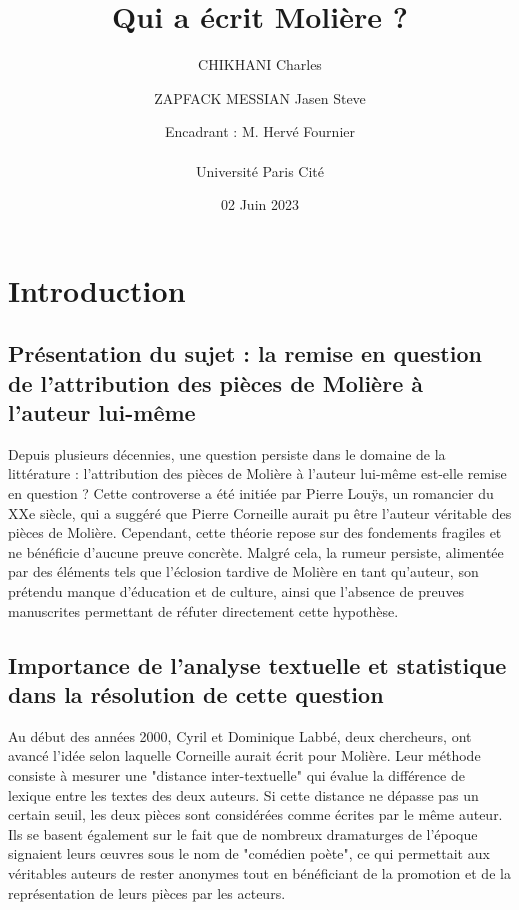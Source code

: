 \documentclass[]{report}
\title{Qui a écrit Molière ?}
\author{CHIKHANI Charles \and ZAPFACK MESSIAN Jasen Steve \\ \and Encadrant : M. Hervé Fournier\\ \\ Université Paris Cité}
\date{02 Juin 2023}
\begin{document}
	\maketitle
	
	\begin{abstract}
	\end{abstract}


	\maketitle
	\tableofcontents
	
	\newpage
	\renewcommand{\thesection}{\arabic{section}}
	\section{Introduction}
	\subsection{Présentation du sujet : la remise en question de l'attribution des pièces de Molière à l'auteur lui-même}
\vspace{\baselineskip}
\hspace{0,5cm}Depuis plusieurs décennies, une question persiste dans le domaine de la
littérature : l'attribution des pièces de Molière à l'auteur lui-même est-elle
remise en question ? Cette controverse a été initiée par Pierre Louÿs, un
romancier du XXe siècle, qui a suggéré que Pierre Corneille aurait pu être
l'auteur véritable des pièces de Molière. Cependant, cette théorie repose sur
des fondements fragiles et ne bénéficie d'aucune preuve concrète. Malgré cela,
la rumeur persiste, alimentée par des éléments tels que l'éclosion tardive de
Molière en tant qu'auteur, son prétendu manque d'éducation et de culture, ainsi
que l'absence de preuves manuscrites permettant de réfuter directement cette
hypothèse.

\subsection{Importance de l'analyse textuelle et statistique dans la résolution de cette question}
\vspace{\baselineskip}
\hspace{0,5cm}Au début des années 2000, Cyril et Dominique Labbé, deux chercheurs, ont avancé
l'idée selon laquelle Corneille aurait écrit pour Molière. Leur méthode consiste
à mesurer une "distance inter-textuelle" qui évalue la différence de lexique
entre les textes des deux auteurs. Si cette distance ne dépasse pas un certain
seuil, les deux pièces sont considérées comme écrites par le même auteur. Ils se
basent également sur le fait que de nombreux dramaturges de l'époque signaient
leurs œuvres sous le nom de "comédien poète", ce qui permettait aux véritables
auteurs de rester anonymes tout en bénéficiant de la promotion et de la
représentation de leurs pièces par les acteurs.
\end{document}
